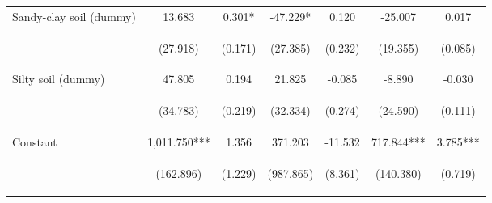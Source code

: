 \begin{center}
\begin{tabular}{lcccccc}
Sandy-clay soil (dummy) & 13.683 & 0.301* & -47.229* & 0.120 & -25.007 & 0.017 \\
\vspace{4pt} & \begin{footnotesize}(27.918)\end{footnotesize} & \begin{footnotesize}(0.171)\end{footnotesize} & \begin{footnotesize}(27.385)\end{footnotesize} & \begin{footnotesize}(0.232)\end{footnotesize} & \begin{footnotesize}(19.355)\end{footnotesize} & \begin{footnotesize}(0.085)\end{footnotesize} \\
Silty soil (dummy) & 47.805 & 0.194 & 21.825 & -0.085 & -8.890 & -0.030 \\
\vspace{4pt} & \begin{footnotesize}(34.783)\end{footnotesize} & \begin{footnotesize}(0.219)\end{footnotesize} & \begin{footnotesize}(32.334)\end{footnotesize} & \begin{footnotesize}(0.274)\end{footnotesize} & \begin{footnotesize}(24.590)\end{footnotesize} & \begin{footnotesize}(0.111)\end{footnotesize} \\
Constant & 1,011.750*** & 1.356 & 371.203 & -11.532 & 717.844*** & 3.785*** \\
 & \begin{footnotesize}(162.896)\end{footnotesize} & \begin{footnotesize}(1.229)\end{footnotesize} & \begin{footnotesize}(987.865)\end{footnotesize} & \begin{footnotesize}(8.361)\end{footnotesize} & \begin{footnotesize}(140.380)\end{footnotesize} & \begin{footnotesize}(0.719)\end{footnotesize} \\

\end{tabular}
\end{center}
